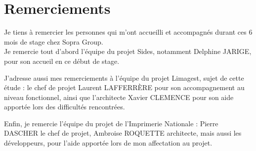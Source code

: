 \cleardoublepage

\chapter*{Remerciements}

\thispagestyle{empty}



Je tiens à remercier les personnes qui m'ont accueilli et accompagnés durant ces 6 mois de stage chez Sopra Group.
\\

Je remercie tout d'abord l'équipe du projet Sides, notamment Delphine JARIGE, pour son accueil en ce début de stage.

J'adresse aussi mes remerciements à l'équipe du projet Limagest, sujet de cette étude : le chef de projet Laurent LAFFERRÈRE pour son accompagnement au niveau fonctionnel, ainsi que l'architecte Xavier CLEMENCE pour son aide apportée lors des difficultés rencontrées.

Enfin, je remercie l'équipe du projet de l'Imprimerie Nationale : Pierre DASCHER le chef de projet, Ambroise ROQUETTE architecte, mais aussi les développeurs, pour l'aide apportée lors de mon affectation au projet.